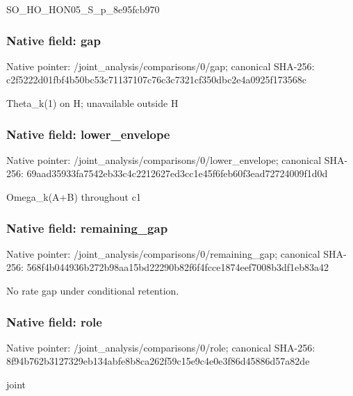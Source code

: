 \documentclass[10pt,a4paper]{article}
\begin{document}
\begingroup\raggedright\sloppy SO\_\allowbreak{}HO\_\allowbreak{}HON05\_\allowbreak{}S\_\allowbreak{}p\_\allowbreak{}8e95fcb970\par\endgroup

\subsubsection{Native field: gap}
Native pointer: /joint\_\allowbreak{}analysis/comparisons/0/gap; canonical SHA-256: c2f5222d01fbf4b50bc53c71137107c76c3c7321cf350dbc2e4a0925f173568c

\begingroup\raggedright\sloppy Theta\_\allowbreak{}k(1) on H;\allowbreak{} unavailable outside H\par\endgroup

\subsubsection{Native field: lower\_\allowbreak{}envelope}
Native pointer: /joint\_\allowbreak{}analysis/comparisons/0/lower\_\allowbreak{}envelope; canonical SHA-256: 69aad35933fa7542eb33c4c2212627ed3cc1e45f6feb60f3ead72724009f1d0d

\begingroup\raggedright\sloppy Omega\_\allowbreak{}k(A+B) throughout c1\par\endgroup

\subsubsection{Native field: remaining\_\allowbreak{}gap}
Native pointer: /joint\_\allowbreak{}analysis/comparisons/0/remaining\_\allowbreak{}gap; canonical SHA-256: 568f4b044936b272b98aa15bd22290b82f6f4fcce1874eef7008b3df1eb83a42

\begingroup\raggedright\sloppy No rate gap under conditional retention.\par\endgroup

\subsubsection{Native field: role}
Native pointer: /joint\_\allowbreak{}analysis/comparisons/0/role; canonical SHA-256: 8f94b762b3127329eb134abfe8b8ca262f59c15e9c4e0e3f86d45886d57a82de

\begingroup\raggedright\sloppy joint\par\endgroup
\end{document}
